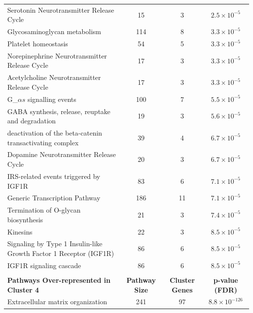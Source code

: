 \begin{table}[!hp]
{\begin{tabular}{lccc}
  \rowcolor{Cluster_Orange!20}
  Serotonin Neurotransmitter Release Cycle &  15 &   3 & $2.5 \times 10^{-5}$ \\ 
  \rowcolor{Cluster_Orange!30}
  Glycosaminoglycan metabolism & 114 &   8 & $3.3 \times 10^{-5}$ \\ 
  \rowcolor{Cluster_Orange!20}
  Platelet homeostasis &  54 &   5 & $3.3 \times 10^{-5}$ \\ 
  \rowcolor{Cluster_Orange!30}
  Norepinephrine Neurotransmitter Release Cycle &  17 &   3 & $3.3 \times 10^{-5}$ \\ 
  \rowcolor{Cluster_Orange!20}
  Acetylcholine Neurotransmitter Release Cycle &  17 &   3 & $3.3 \times 10^{-5}$ \\ 
  \rowcolor{Cluster_Orange!30}
  G_${\alpha s}$ signalling events & 100 &   7 & $5.5 \times 10^{-5}$ \\ 
  \rowcolor{Cluster_Orange!20}
  GABA synthesis, release, reuptake and degradation &  19 &   3 & $5.6 \times 10^{-5}$ \\ 
  \rowcolor{Cluster_Orange!30}
  deactivation of the beta-catenin transactivating complex &  39 &   4 & $6.7 \times 10^{-5}$ \\ 
  \rowcolor{Cluster_Orange!20}
  Dopamine Neurotransmitter Release Cycle &  20 &   3 & $6.7 \times 10^{-5}$ \\ 
  \rowcolor{Cluster_Orange!30}
  IRS-related events triggered by IGF1R &  83 &   6 & $7.1 \times 10^{-5}$ \\ 
  \rowcolor{Cluster_Orange!20}
  Generic Transcription Pathway & 186 &  11 & $7.1 \times 10^{-5}$ \\ 
  \rowcolor{Cluster_Orange!30}
  Termination of O-glycan biosynthesis &  21 &   3 & $7.4 \times 10^{-5}$ \\ 
  \rowcolor{Cluster_Orange!20}
  Kinesins &  22 &   3 & $8.5 \times 10^{-5}$ \\ 
  \rowcolor{Cluster_Orange!30}
  Signaling by Type 1 Insulin-like Growth Factor 1 Receptor (IGF1R) &  86 &   6 & $8.5 \times 10^{-5}$ \\ 
  \rowcolor{Cluster_Orange!20}
  IGF1R signaling cascade &  86 &   6 & $8.5 \times 10^{-5}$ \\
  \hline
  \\ 
  \cellcolor{white} \large{\textbf{Pathways Over-represented in Cluster 4}} & \large{\textbf{Pathway Size}} & \large{\textbf{Cluster Genes}} & \large{\textbf{p-value (FDR)}} \\ %
  \hline 
  \rowcolor{Cluster_Red!20}
  Extracellular matrix organization & 241 &  97 & $8.8 \times 10^{-126}$ \\ 

\end{tabular}}
\end{table}
